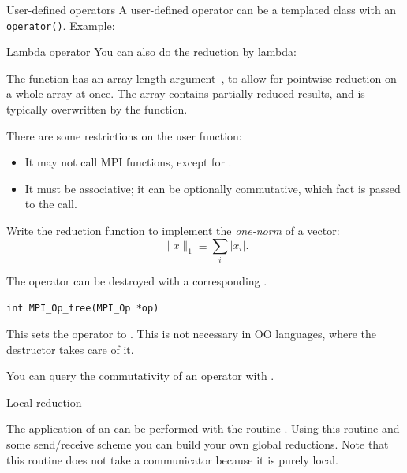 \begin{mplnote}{User-defined operators}
  A user-defined operator can be a templated class with an \lstinline+operator()+.
  Example:
\end{mplnote}

\begin{mplnote}{Lambda operator}
  You can also do the reduction by lambda:
\end{mplnote}

The function has an array length argument~, to allow for
pointwise reduction on a whole array at once. The  array
contains partially reduced results, and is typically overwritten by
the function.

There are some restrictions on the user function:
\begin{itemize}
\item It may not call MPI functions, except for
  .
\item It must be associative; it can be optionally commutative, which
  fact is passed to the  call.
\end{itemize}

\begin{exercise}
  \label{ex:one-norm-op}
  Write the reduction function to implement the
  \emph{one-norm} of a vector:
  \[ \|x\|_1 \equiv \sum_i |x_i|. \]
\end{exercise}

The operator can be destroyed with a corresponding
.
\begin{lstlisting}
int MPI_Op_free(MPI_Op *op)
\end{lstlisting}
This sets the operator to .
This is not necessary in \ac{OO} languages,
where the destructor takes care of it.

You can query the commutativity of an operator with
%
.

 {Local reduction}

The application of an  can be performed with the routine
. Using this routine and some
send/receive scheme you can build your own global reductions. Note
that this routine does not take a communicator because it is purely local.



